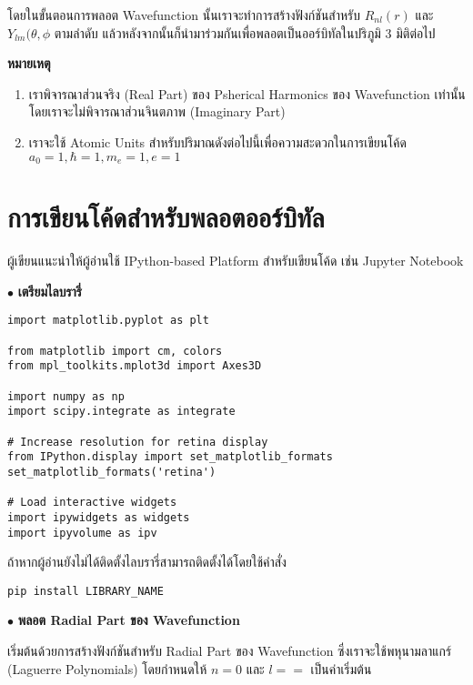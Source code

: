 โดยในขั้นตอนการพลอต Wavefunction นั้นเราจะทำการสร้างฟังก์ชันสำหรับ $R_{nl}(r)$ และ $Y_{lm}(\theta, \phi$ ตามลำดับ
แล้วหลังจากนั้นก็นำมาร่วมกันเพื่อพลอตเป็นออร์บิทัลในปริภูมิ 3 มิติต่อไป

\noindent \textbf{หมายเหตุ} 
\begin{enumerate}[topsep=0pt,noitemsep]
    \item เราพิจารณาส่วนจริง (Real Part) ของ Psherical Harmonics ของ Wavefunction เท่านั้น โดยเราจะไม่พิจารณาส่วนจินตภาพ 
    (Imaginary Part)

    \item เราจะใช้ Atomic Units สำหรับปริมาณดังต่อไปนี้เพื่อความสะดวกในการเขียนโค้ด $a_0=1, \hbar=1, m_e=1, e=1$
\end{enumerate}

\section{การเขียนโค้ดสำหรับพลอตออร์บิทัล}
\label{sec:code_hydro_wfn}

ผู้เขียนแนะนำให้ผู้อ่านใช้ IPython-based Platform สำหรับเขียนโค้ด เช่น Jupyter Notebook

$\bullet$ \textbf{เตรียมไลบรารี่}

\begin{lstlisting}[style=MyPython]
%matplotlib inline
import matplotlib.pyplot as plt

from matplotlib import cm, colors
from mpl_toolkits.mplot3d import Axes3D

import numpy as np
import scipy.integrate as integrate

# Increase resolution for retina display
from IPython.display import set_matplotlib_formats
set_matplotlib_formats('retina')

# Load interactive widgets
import ipywidgets as widgets
import ipyvolume as ipv
\end{lstlisting}

\noindent ถ้าหากผู้อ่านยังไม่ได้ติดตั้งไลบรารี่สามารถติดตั้งได้โดยใช้คำสั่ง

\begin{lstlisting}[style=MyBash]
pip install LIBRARY_NAME
\end{lstlisting}

\bigskip

$\bullet$ \textbf{พลอต Radial Part ของ Wavefunction}

เริ่มต้นด้วยการสร้างฟังก์ชันสำหรับ Radial Part ของ Wavefunction ซึ่งเราจะใช้พหุนามลาแกร์ (Laguerre Polynomials) โดยกำหนดให้ 
$n = 0$ และ $l = =$ เป็นค่าเริ่มต้น


